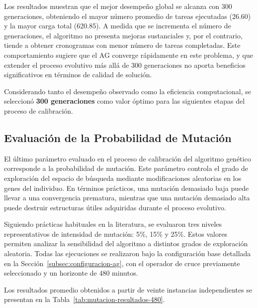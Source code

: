 Los resultados muestran que el mejor desempeño global se alcanza con 300 generaciones, obteniendo el mayor número promedio de tareas ejecutadas (26.60) y la mayor carga total (620.85). A medida que se incrementa el número de generaciones, el algoritmo no presenta mejoras sustanciales y, por el contrario, tiende a obtener cronogramas con menor número de tareas completadas. Este comportamiento sugiere que el AG converge rápidamente en este problema, y que extender el proceso evolutivo más allá de 300 generaciones no aporta beneficios significativos en términos de calidad de solución.

Considerando tanto el desempeño observado como la eficiencia computacional, se seleccionó \textbf{300 generaciones} como valor óptimo para las siguientes etapas del proceso de calibración.

\subsection{Evaluación de la Probabilidad de Mutación}
\label{subsec:mutacion}

El último parámetro evaluado en el proceso de calibración del algoritmo genético corresponde a la probabilidad de mutación. Este parámetro controla el grado de exploración del espacio de búsqueda mediante modificaciones aleatorias en los genes del individuo. En términos prácticos, una mutación demasiado baja puede llevar a una convergencia prematura, mientras que una mutación demasiado alta puede destruir estructuras útiles adquiridas durante el proceso evolutivo.

Siguiendo prácticas habituales en la literatura, se evaluaron tres niveles representativos de intensidad de mutación: 5\%, 15\% y 25\%. Estos valores permiten analizar la sensibilidad del algoritmo a distintos grados de exploración aleatoria. Todas las ejecuciones se realizaron bajo la configuración base detallada en la Sección~\ref{subsec:configuracion-ag}, con el operador de cruce previamente seleccionado y un horizonte de 480 minutos.

Los resultados promedio obtenidos a partir de veinte instancias independientes se presentan en la Tabla~\ref{tab:mutacion-resultados-480}.

\begin{table}[htbp]
\centering
\small
\caption{Resultados promedio del AG para diferentes probabilidades de mutación (480 minutos).}
\label{tab:mutacion-resultados-480}
\end{table}

